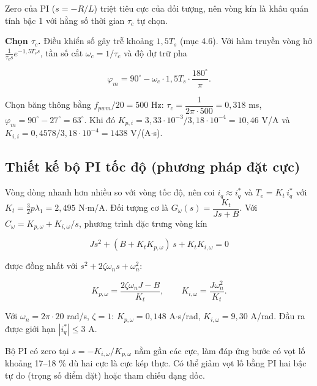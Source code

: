 Zero của PI ($s=-R/L$) triệt tiêu cực của đối tượng, nên vòng kín là khâu quán tính bậc 1 với hằng số thời gian $\tau_c$ tự chọn.

\textbf{Chọn $\tau_c$.} Điều khiển số gây trễ khoảng $1{,}5T_s$ (mục 4.6). Với hàm truyền vòng hở $\frac{1}{\tau_c s}e^{-1{,}5T_s s}$, tần số cắt $\omega_c = 1/\tau_c$ và độ dự trữ pha

\begin{equation}
\varphi_m = 90^\circ - \omega_c\cdot 1{,}5T_s\cdot\frac{180^\circ}{\pi}.
\tag{4.3}\label{eq:4.3}
\end{equation}

Chọn băng thông bằng $f_{pwm}/20 = 500$ Hz: $\tau_c = \dfrac{1}{2\pi\cdot 500} = 0{,}318$ ms, $\varphi_m = 90^\circ - 27^\circ = 63^\circ$.
Khi đó $K_{p,i} = 3{,}33\cdot10^{-3}/3{,}18\cdot10^{-4} = 10{,}46$ V/A và $K_{i,i} = 0{,}4578/3{,}18\cdot10^{-4} = 1438$ V/(A$\cdot$s).

\subsection{Thiết kế bộ PI tốc độ (phương pháp đặt cực)}\label{sec:4.3}

Vòng dòng nhanh hơn nhiều so với vòng tốc độ, nên coi $i_q \approx i_q^*$ và $T_e = K_t\, i_q^*$ với $K_t = \tfrac32 p\lambda_1 = 2{,}495$ N$\cdot$m/A. Đối tượng cơ là $G_\omega(s) = \dfrac{K_t}{J s + B}$. Với $C_\omega = K_{p,\omega} + K_{i,\omega}/s$, phương trình đặc trưng vòng kín

\begin{equation}
J s^2 + (B + K_t K_{p,\omega})\,s + K_t K_{i,\omega} = 0
\tag{4.4}\label{eq:4.4}
\end{equation}

được đồng nhất với $s^2 + 2\zeta\omega_n s + \omega_n^2$:

\begin{equation}
K_{p,\omega} = \frac{2\zeta\omega_n J - B}{K_t},\qquad K_{i,\omega} = \frac{J\omega_n^2}{K_t}.
\tag{4.5}\label{eq:4.5}
\end{equation}

Với $\omega_n = 2\pi\cdot 20$ rad/s, $\zeta = 1$: $K_{p,\omega} = 0{,}148$ A$\cdot$s/rad, $K_{i,\omega} = 9{,}30$ A/rad. Đầu ra được giới hạn $|i_q^*|\le 3$ A.

\begin{ghichu}[Vì sao vẫn có vọt lố khi chọn $\zeta=1$?]
Bộ PI có zero tại $s = -K_{i,\omega}/K_{p,\omega}$ nằm gần các cực, làm đáp ứng bước có vọt lố khoảng 17–18 \% dù hai cực là cực kép thực. Có thể giảm vọt lố bằng PI hai bậc tự do (trọng số điểm đặt) hoặc tham chiếu dạng dốc.
\end{ghichu}

